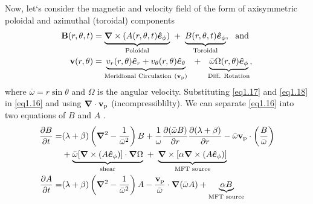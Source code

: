Now, let`s consider the magnetic and velocity field of the form of axisymmetric poloidal and azimuthal (toroidal) components
\begin{align}
    \vb{B}(r,\theta,t)&=\underbrace{\bm{\nabla}\times (A(r, \theta, t)\bm{\hat{e}}_\phi)}_{\text{Poloidal}}~+~\underbrace{B(r,\theta,t)\bm{\hat{e}}_\phi}_{\text{Toroidal}}, ~~\text{and} \label{eq1.17}\\
     \vb{v}(r,\theta)&=\underbrace{v_r(r,\theta)\bm{\hat{e}}_r+v_\theta(r,\theta)\bm{\hat{e}}_\theta}_{\text{Meridional  Circulation}~(\vb{v}_{\rm p})}~~+~~\underbrace{\bar{\omega}\Omega(r,\theta)\bm{\hat{e}}_\phi}_{\text{Diff. Rotation}}, \label{eq1.18}
\end{align}
where $\bar{\omega}=r\sin{\theta}$ and $\Omega$ is the angular velocity. Substituting \autoref{eq1.17} and \ref{eq1.18} in \autoref{eq1.16} and using $\bm{\nabla}\cdot\vb{v}_{\rm p}$ (incompressiblilty). We can separate \autoref{eq1.16} into two equations of $B$ and $A$ \citep[for derivation see ][]{Choudhuri1998book, Charbonneau2010, Priest2014book}.
\begin{align}
    \frac{\partial B}{\partial t}=&(\lambda+\beta)\left( \bm{\nabla}^2-\frac{1}{\bar{\omega}^2}\right)B+\frac{1}{\omega}\frac{\partial(\bar{\omega}B)}{\partial r}\frac{\partial(\lambda+\beta)}{\partial r}-\bar{\omega}\vb{v}_{\rm p}\cdot\left( \frac{B}{\bar{\omega}}\right)\nonumber\\
    &+\underbrace{\bar{\omega}[\bm{\nabla}\times(A\bm{\hat{e}}_\phi)]\cdot\bm{\nabla}\Omega}_{\text{shear}}~+~\underbrace{\bm{\nabla}\times[\alpha\bm{\nabla}\times(A\bm{\hat{e}}_\phi)]}_{\text{MFT source}}\label{eq1.19}\\
    \frac{\partial A}{\partial t}=&(\lambda+\beta)\left( \bm{\nabla}^2-\frac{1}{\bar{\omega}^2}\right)A-\frac{\vb{v}_{\rm p}}{\bar{\omega}}\cdot\bm{\nabla}(\bar{\omega}A)+\underbrace{\alpha B}_{\text{MFT source}} \label{eq1.20}
\end{align}

